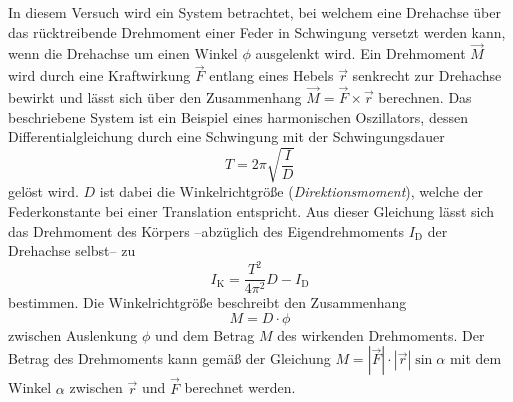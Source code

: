In diesem Versuch wird ein System betrachtet, bei welchem eine Drehachse über das rücktreibende Drehmoment einer Feder in Schwingung versetzt werden kann, wenn die Drehachse
um einen Winkel $\phi$ ausgelenkt wird. Ein Drehmoment $\vec{M}$ wird durch eine Kraftwirkung $\vec{F}$ entlang eines Hebels $\vec{r}$ senkrecht zur Drehachse bewirkt und 
lässt sich über den Zusammenhang $\vec{M} = \vec{F} \times \vec{r}$ berechnen.
Das beschriebene System ist ein Beispiel eines harmonischen Oszillators, dessen Differentialgleichung durch eine Schwingung mit der Schwingungsdauer 
\begin{equation*}
    \label{eqn:Schwingungsdauer}
    T = 2\pi \sqrt{\frac{I}{D}}
\end{equation*}
gelöst wird. $D$ ist dabei die Winkelrichtgröße (\textit{Direktionsmoment}), welche der Federkonstante bei einer Translation entspricht. Aus dieser Gleichung lässt sich das Drehmoment 
des Körpers --abzüglich des Eigendrehmoments $I_\text{D}$ der Drehachse selbst-- zu
\begin{equation}
    \label{eqn:I_K}
    I_\text{K} = \frac{T^2}{4\pi^2}D - I_\text{D}
\end{equation}
bestimmen.
Die Winkelrichtgröße beschreibt den Zusammenhang 
\begin{equation}
    \label{eqn:Winkelrichtgröße}
    M = D \cdot \phi
\end{equation}
zwischen Auslenkung $\phi$ und dem Betrag $M$ des wirkenden Drehmoments. Der Betrag des Drehmoments kann gemäß der Gleichung $M = |\vec{F}|\cdot|\vec{r}| \sin{\alpha}$ mit 
dem Winkel $\alpha$ zwischen $\vec{r}$ und $\vec{F}$ berechnet werden.
